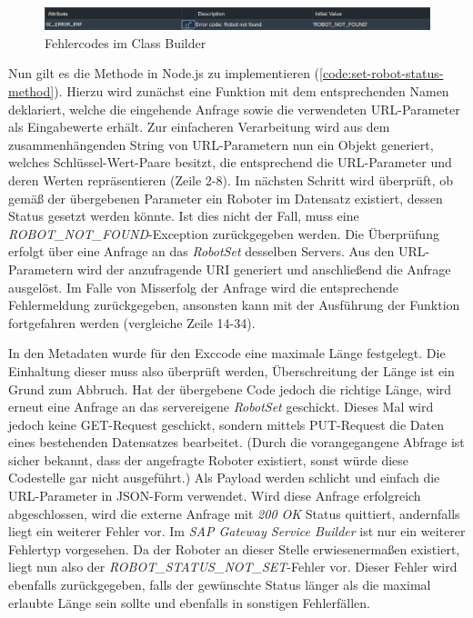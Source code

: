\begin{figure}[!ht]
	\centering
	\includegraphics[width=\textwidth]{Bilder/ABAP/2020-12-04 10_22_23-Class Builder_ Display Class ZCL_ZEWM_ROBCO_DPC_EXT_cut.png}
	\caption{Fehlercodes im Class Builder}
	\label{fig:class-builder}
\end{figure}

Nun gilt es die Methode in Node.js zu implementieren (\autoref{code:set-robot-status-method}).
Hierzu wird zunächst eine Funktion mit dem entsprechenden Namen deklariert, welche die eingehende Anfrage sowie die verwendeten URL-Parameter als Eingabewerte erhält.
Zur einfacheren Verarbeitung wird aus dem zusammenhängenden String von URL-Parametern nun ein Objekt generiert, welches Schlüssel-Wert-Paare besitzt, die entsprechend die URL-Parameter und deren Werten repräsentieren (Zeile 2-8).
Im nächsten Schritt wird überprüft, ob gemäß der übergebenen Parameter ein Roboter im Datensatz existiert, dessen Status gesetzt werden könnte.
Ist dies nicht der Fall, muss eine \emph{ROBOT\_NOT\_FOUND}-Exception zurückgegeben werden.
Die Überprüfung erfolgt über eine Anfrage an das \emph{RobotSet} desselben Servers.
Aus den URL-Parametern wird der anzufragende \ac{URI} generiert und anschließend die Anfrage ausgelöst.
Im Falle von Misserfolg der Anfrage wird die entsprechende Fehlermeldung zurückgegeben, ansonsten kann mit der Ausführung der Funktion fortgefahren werden (vergleiche Zeile 14-34).

In den Metadaten wurde für den Exccode eine maximale Länge festgelegt.
Die Einhaltung dieser muss also überprüft werden, Überschreitung der Länge ist ein Grund zum Abbruch.
Hat der übergebene Code jedoch die richtige Länge, wird erneut eine Anfrage an das servereigene \emph{RobotSet} geschickt.
Dieses Mal wird jedoch keine GET-Request geschickt, sondern mittels PUT-Request die Daten eines bestehenden Datensatzes bearbeitet.
(Durch die vorangegangene Abfrage ist sicher bekannt, dass der angefragte Roboter existiert, sonst würde diese Codestelle gar nicht ausgeführt.)
Als Payload werden schlicht und einfach die URL-Parameter in \ac{JSON}-Form verwendet.
Wird diese Anfrage erfolgreich abgeschlossen, wird die externe Anfrage mit \emph{200 OK} Status quittiert, andernfalls liegt ein weiterer Fehler vor.
Im \emph{SAP Gateway Service Builder} ist nur ein weiterer Fehlertyp vorgesehen.
Da der Roboter an dieser Stelle erwiesenermaßen existiert, liegt nun also der \emph{ROBOT\_STATUS\_NOT\_SET}-Fehler vor.
Dieser Fehler wird ebenfalls zurückgegeben, falls der gewünschte Status länger als die maximal erlaubte Länge sein sollte und ebenfalls in sonstigen Fehlerfällen.

